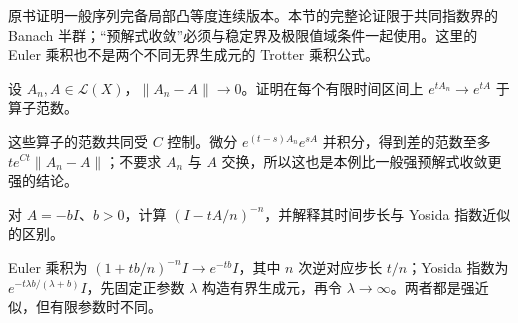 原书证明一般序列完备局部凸等度连续版本。本节的完整论证限于共同指数界的 Banach 半群；“预解式收敛”必须与稳定界及极限值域条件一起使用。这里的 Euler 乘积也不是两个不同无界生成元的 Trotter 乘积公式。

\begin{exercise}[有界生成元的范数扰动]\label{ex:y9-bounded-perturbation}
设 $A_n,A\in\mathcal L(X)$，$\|A_n-A\|\to0$。证明在每个有限时间区间上 $e^{tA_n}\to e^{tA}$ 于算子范数。
\end{exercise}
\begin{solution}
这些算子的范数共同受 $C$ 控制。微分 $e^{(t-s)A_n}e^{sA}$ 并积分，得到差的范数至多 $t e^{Ct}\|A_n-A\|$；不要求 $A_n$ 与 $A$ 交换，所以这也是本例比一般强预解式收敛更强的结论。
\end{solution}

\begin{exercise}\label{ex:y9-euler-scalar}
对 $A=-bI$、$b>0$，计算 $(I-tA/n)^{-n}$，并解释其时间步长与 Yosida 指数近似的区别。
\end{exercise}
\begin{solution}
Euler 乘积为 $(1+tb/n)^{-n}I\to e^{-tb}I$，其中 $n$ 次逆对应步长 $t/n$；Yosida 指数为 $e^{-t\lambda b/(\lambda+b)}I$，先固定正参数 $\lambda$ 构造有界生成元，再令 $\lambda\to\infty$。两者都是强近似，但有限参数时不同。
\end{solution}
